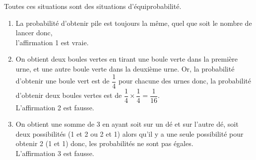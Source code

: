 \begin{corrige}
   Toutes ces situations sont des situations d'équiprobabilité. \\
   \begin{enumerate}
      \item La probabilité d'obtenir pile est toujours la même, quel que soit le nombre de lancer donc, \\
         {\blue l'affirmation 1 est vraie}.
       \item On obtient deux boules vertes en tirant une boule verte dans la première urne, et une autre boule verte dans la deuxième urne. Or, la probabilité d'obtenir une boule vert est de $\dfrac14$ pour chacune des urnes donc, la probabilité d'obtenir deux boules vertes est de $\dfrac14\times\dfrac14 =\dfrac{1}{16}$. \\ [1mm]
         {\blue L'affirmation 2 est fausse}.
      \item On obtient une somme de 3 en ayant soit  \fg{} sur un dé et  \fg{} sur l'autre dé, soit deux possibilités (1 et 2 ou 2 et 1) alors qu'il y a une seule possibilité pour obtenir 2 (1 et 1) donc, les probabilités ne sont pas égales. \\
         {\blue L'affirmation 3 est fausse}.
   \end{enumerate}
\end{corrige}

\bigskip


